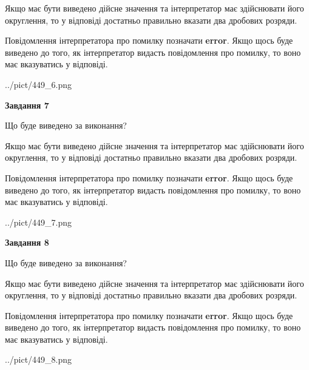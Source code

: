 \documentclass[12pt, ukrainian]{article}
\begin{document}
{\begin {Large}
Якщо має бути виведено дійсне значення та інтерпретатор має здійснювати його округлення, 
то у відповіді достатньо правильно вказати два дробових розряди.

Повідомлення інтерпретатора про помилку позначати \textbf{error}.
Якщо щось буде виведено до того, як інтерпретатор видасть повідомлення про помилку, 
то воно має вказуватись у відповіді. \par

\begin{center}
	{../pict/449_6.png}
\end{center}
\newpage

{\begin {center}\textbf{Завдання 7}\end {center}}\par
Що буде виведено за виконання? \par

Якщо має бути виведено дійсне значення та інтерпретатор має здійснювати його округлення, 
то у відповіді достатньо правильно вказати два дробових розряди.

Повідомлення інтерпретатора про помилку позначати \textbf{error}.
Якщо щось буде виведено до того, як інтерпретатор видасть повідомлення про помилку, 
то воно має вказуватись у відповіді. \par

\begin{center}
	{../pict/449_7.png}
\end{center}
\newpage

{\begin {center}\textbf{Завдання 8}\end {center}}\par
Що буде виведено за виконання? \par

Якщо має бути виведено дійсне значення та інтерпретатор має здійснювати його округлення, 
то у відповіді достатньо правильно вказати два дробових розряди.

Повідомлення інтерпретатора про помилку позначати \textbf{error}.
Якщо щось буде виведено до того, як інтерпретатор видасть повідомлення про помилку, 
то воно має вказуватись у відповіді. \par

\begin{center}
	{../pict/449_8.png}
\end{center}
\newpage


\end{Large}}
\end{document}
